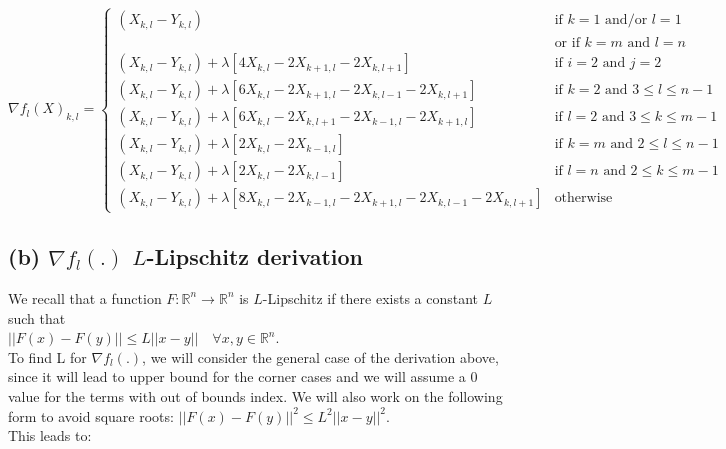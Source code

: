 \documentclass{article}
\begin{document}
$$
\nabla f_l(X)_{k,l} =  
                \begin{cases}
                (X_{k,l} - Y_{k,l})  & \text{if $k=1$ and/or $l=1$} \\
                                   & \text{or if $k=m$ and $l=n$}  \\
                (X_{k,l} - Y_{k,l}) + \lambda [4X_{k,l} - 2X_{k+1,l} - 2X_{k,l+1}]
                & \text{if $i=2$ and $j=2$} \\
                (X_{k,l} - Y_{k,l}) + \lambda[6X_{k,l} - 2X_{k+1,l} - 2X_{k,l-1}
                -2X_{k,l+1}]  
                & \text{if $k=2$ and $3\leq l\leq n-1$} \\
                (X_{k,l} - Y_{k,l}) + \lambda[6X_{k,l} - 2X_{k,l+1} - 2X_{k-1,l}
                -2X_{k+1,l}]  
                & \text{if $l=2$ and $3\leq k\leq m-1$} \\
                (X_{k,l} - Y_{k,l}) + \lambda[2X_{k,l} - 2X_{k-1,l}] 
                & \text{if $k=m$ and $2\leq l\leq n-1$} \\
                (X_{k,l} - Y_{k,l}) + \lambda[2X_{k,l} - 2X_{k,l-1}] 
                & \text{if $l=n$ and $2\leq k\leq m-1$} \\
                (X_{k,l} - Y_{k,l}) + \lambda[8X_{k,l} - 2X_{k-1,l} - 2X_{k+1,l} 
                -2X_{k,l-1} - 2X_{k,l+1}] 
                & \text{otherwise} 
                \end{cases}
$$


\subsection*{(b) $\nabla f_{l}(.)$ $L$-Lipschitz derivation}
We recall that a function $F : \mathbb{R}^n \to \mathbb{R}^n$ is $L$-Lipschitz if there exists 
a constant $L$ such that \\$ ||F(x) - F(y)|| \leq L||x-y|| \quad \forall x,y \in \mathbb{R}^n$. \\
To find L for $\nabla f_l(.)$, we will consider the general case of the derivation above, 
since it will lead to upper bound for the corner cases and we will assume a 0 value for
the terms with out of bounds index. We will also work on the following form to avoid square
roots: $||F(x) - F(y)||^2 \leq L^2||x-y||^2$. \\This leads to:
\end{document}
